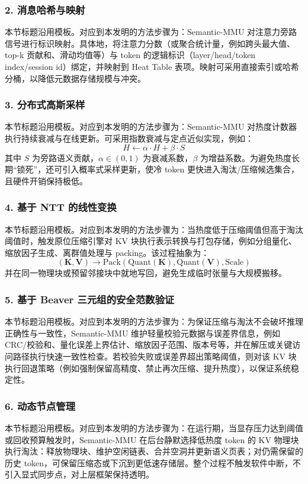 \documentclass[12pt,a4paper]{article}
\begin{document}
\subsubsection{2. 消息哈希与映射}
本节标题沿用模板。对应到本发明的方法步骤为：Semantic-MMU 对注意力旁路信号进行标识映射。具体地，将注意力分数（或聚合统计量，例如跨头最大值、top-k 贡献和、滑动均值等）与 token 的逻辑标识（layer/head/token index/session id）绑定，并映射到 Heat Table 表项。映射可采用直接索引或哈希分桶，以降低元数据存储规模与冲突。

\subsubsection{3. 分布式高斯采样}
本节标题沿用模板。对应到本发明的方法步骤为：Semantic-MMU 对热度计数器执行持续衰减与在线更新。可采用指数衰减与定点近似实现，例如：
\[
H \leftarrow \alpha \cdot H + \beta \cdot S
\]
其中 $S$ 为旁路语义贡献，$\alpha \in (0,1)$ 为衰减系数，$\beta$ 为增益系数。为避免热度长期“锁死”，还可引入概率式采样更新，使冷 token 更快进入淘汰/压缩候选集合，且硬件开销保持极低。

\subsubsection{4. 基于 NTT 的线性变换}
本节标题沿用模板。对应到本发明的方法步骤为：当热度低于压缩阈值但高于淘汰阈值时，触发原位压缩引擎对 KV 块执行表示转换与打包存储，例如分组量化、缩放因子生成、离群值处理与 packing。该过程抽象为：
\[
(\mathbf{K},\mathbf{V}) \rightarrow \text{Pack}(\text{Quant}(\mathbf{K}), \text{Quant}(\mathbf{V}), \text{Scale})
\]
并在同一物理块或预留邻接块中就地写回，避免生成临时张量与大规模搬移。

\subsubsection{5. 基于 Beaver 三元组的安全范数验证}
本节标题沿用模板。对应到本发明的方法步骤为：为保证压缩与淘汰不会破坏推理正确性与一致性，Semantic-MMU 维护轻量校验元数据与误差界信息，例如 CRC/校验和、量化误差上界估计、缩放因子范围、版本号等，并在解压或关键访问路径执行快速一致性检查。若校验失败或误差界超出策略阈值，则对该 KV 块执行回退策略（例如强制保留高精度、禁止再次压缩、提升热度），以保证系统稳定性。

\subsubsection{6. 动态节点管理}
本节标题沿用模板。对应到本发明的方法步骤为：在运行期，当显存压力达到阈值或回收预算触发时，Semantic-MMU 在后台静默选择低热度 token 的 KV 物理块执行淘汰：释放物理块、维护空闲链表、合并空洞并更新语义页表；对仍需保留的历史 token，可保留压缩态或下沉到更低速存储层。整个过程不触发软件中断，不引入显式同步点，对上层框架保持透明。
\end{document}
